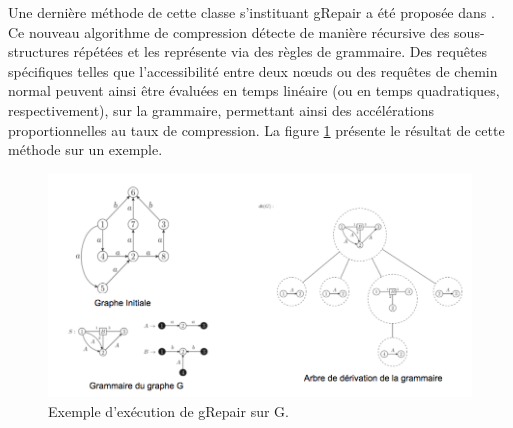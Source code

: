 
	Une dernière méthode de cette classe s'instituant gRepair a été proposée dans \citep{maneth2018grammar}. Ce nouveau algorithme de compression détecte de manière récursive des sous-structures répétées et les représente via des règles de grammaire.  Des requêtes spécifiques telles que l'accessibilité entre deux nœuds ou des requêtes de chemin normal peuvent ainsi être évaluées en temps linéaire (ou en temps quadratiques, respectivement), sur la grammaire, permettant ainsi des accélérations proportionnelles au taux de compression. La figure \ref{gRepair} présente le résultat de cette méthode sur un exemple. 
	
	\begin{figure}[h]
			\includegraphics[scale=0.5,center]{./ressources/image/grepair.png}
			\caption[Exemple d'exécution de gRepair sur G.]{Exemple d'exécution de gRepair sur G.}
			\label{gRepair}
	\end{figure}